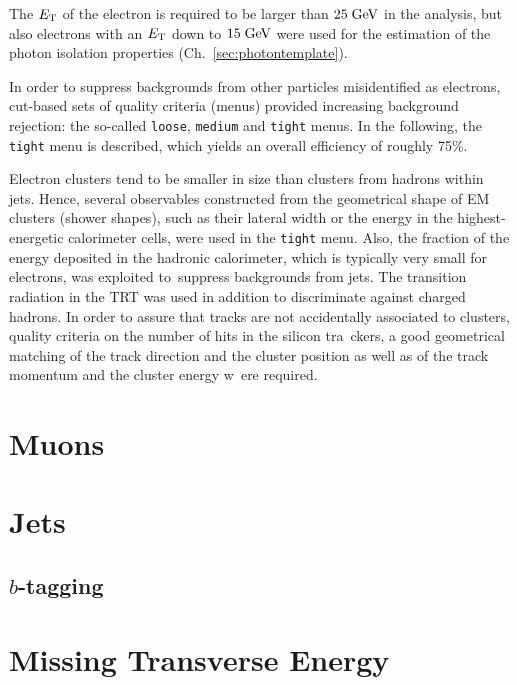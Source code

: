 The $\mbox{\ensuremath{E_{\mathrm{T}}}}$ of the electron is required to be larger than \mbox{$25 \; \mathrm{GeV}$} in the analysis, but also electrons with an $\mbox{\ensuremath{E_{\mathrm{T}}}}$ down
to \mbox{$15 \; \mathrm{GeV}$} were used for the estimation of the photon isolation properties (Ch.~\ref{sec:photontemplate}).

In order to suppress backgrounds from other particles misidentified as electrons, cut-based sets of quality criteria (menus)
provided increasing background rejection: the so-called \texttt{loose}, \texttt{medium} and \texttt{tight} menus.
In the following, the \texttt{tight} menu is described, which yields an overall efficiency of roughly 75\%.

Electron clusters tend to be smaller in size than clusters from hadrons within jets.
Hence, several observables constructed from the geometrical shape of EM clusters (shower shapes), such as their lateral width or
the energy in the highest-energetic calorimeter cells, were used in the \texttt{tight} menu.
Also, the fraction of the energy deposited in the hadronic calorimeter, which is typically very small for electrons, was exploited to\
 suppress
backgrounds from jets.
The transition radiation in the TRT was used in addition to discriminate against charged hadrons.
In order to assure that tracks are not accidentally associated to clusters, quality criteria on the number of hits in the silicon tra\
ckers,
a good geometrical matching of the track direction and the cluster position as well as of the track momentum and the cluster energy w\
ere required.


\section{Muons}
\label{sec:muons}

\section{Jets}
\label{sec:jets}

\subsection{$b$-tagging}
\label{sec:btag}

\section{Missing Transverse Energy}
\label{sec:met}
